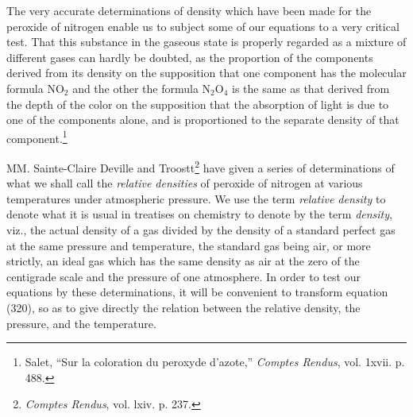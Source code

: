 \documentclass[12pt]{memoir}
\begin{document}
The very accurate determinations of density which have been made for the peroxide of nitrogen enable us to subject some of our equations to a very critical test. That this substance in the gaseous state is properly regarded as a mixture of different gases can hardly be doubted, as the proportion of the components derived from its density on the supposition that one component has the molecular formula NO$_2$ and the other the formula N$_2$O$_4$ is the same as that derived from the depth of the color on the supposition that the absorption of light is due to one of the components alone, and is proportioned to the separate density of that component.\footnote{Salet, ``Sur la coloration du peroxyde d'azote,'' \textit{Comptes Rendus}, vol. 1xvii. p. 488. }

MM. Sainte-Claire Deville and Troostt\footnote{\textit{Comptes Rendus}, vol. lxiv. p. 237.} have given a series of determinations of what we shall call the \textit{relative densities} of peroxide of nitrogen at various temperatures under atmospheric pressure. We use the term \textit{relative density} to denote what it is usual in treatises on chemistry to denote by the term \textit{density}, viz., the actual density of a gas divided by the density of a standard perfect gas at the same pressure and temperature, the standard gas being air, or more strictly, an ideal gas which has the same density as air at the zero of the centigrade scale and the pressure of one atmosphere. In order to test our equations by these determinations, it will be convenient to transform equation (320), so as to give directly the relation between the relative density, the pressure, and the temperature.
\end{document}
